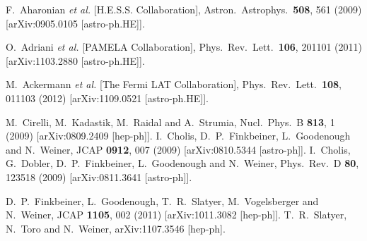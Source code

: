   F.~Aharonian {\it et al.}  [H.E.S.S. Collaboration],
  Astron.\ Astrophys.\  {\bf 508}, 561 (2009)
  [arXiv:0905.0105 [astro-ph.HE]].

  O.~Adriani {\it et al.}  [PAMELA Collaboration],
  Phys.\ Rev.\ Lett.\  {\bf 106}, 201101 (2011)
  [arXiv:1103.2880 [astro-ph.HE]].

  M.~Ackermann {\it et al.}  [The Fermi LAT Collaboration],
  Phys.\ Rev.\ Lett.\  {\bf 108}, 011103 (2012)
  [arXiv:1109.0521 [astro-ph.HE]].

  M.~Cirelli, M.~Kadastik, M.~Raidal and A.~Strumia,
  Nucl.\ Phys.\ B {\bf 813}, 1 (2009)
  [arXiv:0809.2409 [hep-ph]].
  I.~Cholis, D.~P.~Finkbeiner, L.~Goodenough and N.~Weiner,
  JCAP {\bf 0912}, 007 (2009)
  [arXiv:0810.5344 [astro-ph]].
  I.~Cholis, G.~Dobler, D.~P.~Finkbeiner, L.~Goodenough and N.~Weiner,
  Phys.\ Rev.\ D {\bf 80}, 123518 (2009)
  [arXiv:0811.3641 [astro-ph]].

  D.~P.~Finkbeiner, L.~Goodenough, T.~R.~Slatyer, M.~Vogelsberger and N.~Weiner,
  JCAP {\bf 1105}, 002 (2011)
  [arXiv:1011.3082 [hep-ph]].
  T.~R.~Slatyer, N.~Toro and N.~Weiner,
  arXiv:1107.3546 [hep-ph].



